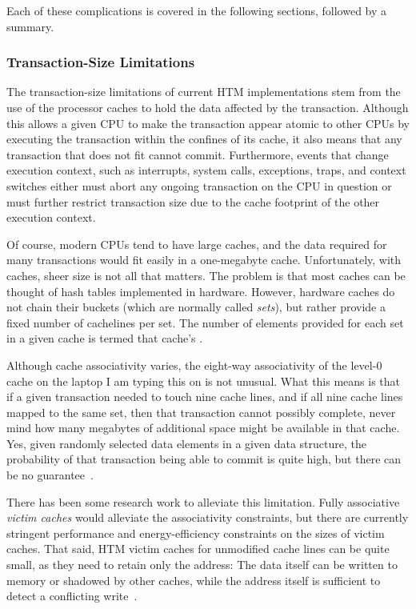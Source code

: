 Each of these complications is covered in the following sections,
followed by a summary.

\subsubsection{Transaction-Size Limitations}
\label{sec:future:Transaction-Size Limitations}

The transaction-size limitations of current HTM implementations
stem from the use of the processor caches to hold the data
affected by the transaction.
Although this allows a given CPU to make the transaction appear atomic to
other CPUs by executing the transaction within the confines of its cache,
it also means that any transaction that does not fit cannot commit.
Furthermore, events that change execution context, such as interrupts,
system calls, exceptions, traps, and context switches either must
abort any ongoing transaction on the CPU in question or must further
restrict transaction size due to the cache footprint of the other
execution context.

Of course, modern CPUs tend to have large caches, and the data required
for many transactions would fit easily in a one-megabyte cache.
Unfortunately, with caches, sheer size is not all that matters.
The problem is that most caches
can be thought of hash tables implemented in hardware.
However, hardware caches do not chain their buckets (which are normally
called \emph{sets}), but rather
provide a fixed number of cachelines per set.
The number of elements provided for each set in a given cache
is termed that cache's \emph{}.

Although cache associativity varies, the eight-way associativity of
the level-0 cache on the laptop I am typing this on is not unusual.
What this means is that if a given transaction needed to touch
nine cache lines, and if all nine cache lines mapped to the same
set, then that transaction cannot possibly complete, never mind how
many megabytes of additional space might be available in that cache.
Yes, given randomly selected data elements in a given data structure,
the probability of that transaction being able to commit is quite
high, but there can be no guarantee~\cite{PaulEMcKenney2012HTMCacheGeometry}.

There has been some research work to alleviate this limitation.
Fully associative \emph{victim caches} would alleviate the associativity
constraints, but there are currently stringent performance and
energy-efficiency constraints on the sizes of victim caches.
That said, HTM victim caches for unmodified cache lines can be quite
small, as they need to retain only the address:
The data itself can be written to memory or shadowed by other caches,
while the address itself is sufficient to detect a conflicting
write~\cite{RaviRajwar2012TSX}.

